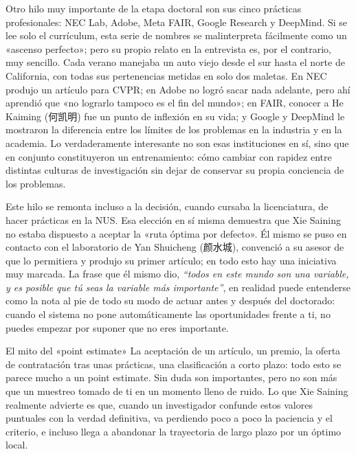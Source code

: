 Otro hilo muy importante de la etapa doctoral son sus cinco prácticas profesionales: NEC Lab, Adobe, Meta FAIR, Google Research y DeepMind. Si se lee solo el currículum, esta serie de nombres se malinterpreta fácilmente como un «ascenso perfecto»; pero su propio relato en la entrevista es, por el contrario, muy sencillo. Cada verano manejaba un auto viejo desde el sur hasta el norte de California, con todas sus pertenencias metidas en solo dos maletas. En NEC produjo un artículo para CVPR; en Adobe no logró sacar nada adelante, pero ahí aprendió que «no lograrlo tampoco es el fin del mundo»; en FAIR, conocer a He Kaiming (何凯明) fue un punto de inflexión en su vida; y Google y DeepMind le mostraron la diferencia entre los límites de los problemas en la industria y en la academia. Lo verdaderamente interesante no son esas instituciones en sí, sino que en conjunto constituyeron un entrenamiento: cómo cambiar con rapidez entre distintas culturas de investigación sin dejar de conservar su propia conciencia de los problemas.

Este hilo se remonta incluso a la decisión, cuando cursaba la licenciatura, de hacer prácticas en la NUS. Esa elección en sí misma demuestra que Xie Saining no estaba dispuesto a aceptar la «ruta óptima por defecto». Él mismo se puso en contacto con el laboratorio de Yan Shuicheng (颜水城), convenció a su asesor de que lo permitiera y produjo su primer artículo; en todo esto hay una iniciativa muy marcada. La frase que él mismo dio, \textit{``todos en este mundo son una variable, y es posible que tú seas la variable más importante''}, en realidad puede entenderse como la nota al pie de todo su modo de actuar antes y después del doctorado: cuando el sistema no pone automáticamente las oportunidades frente a ti, no puedes empezar por suponer que no eres importante.

\begin{warningbox}{El mito del «point estimate»}
La aceptación de un artículo, un premio, la oferta de contratación tras unas prácticas, una clasificación a corto plazo: todo esto se parece mucho a un point estimate. Sin duda son importantes, pero no son más que un muestreo tomado de ti en un momento lleno de ruido. Lo que Xie Saining realmente advierte es que, cuando un investigador confunde estos valores puntuales con la verdad definitiva, va perdiendo poco a poco la paciencia y el criterio, e incluso llega a abandonar la trayectoria de largo plazo por un óptimo local.
\end{warningbox}

